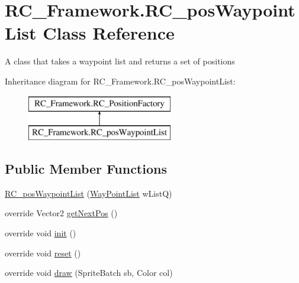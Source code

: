 \hypertarget{class_r_c___framework_1_1_r_c__pos_waypoint_list}{}\section{R\+C\+\_\+\+Framework.\+R\+C\+\_\+pos\+Waypoint\+List Class Reference}
\label{class_r_c___framework_1_1_r_c__pos_waypoint_list}


A class that takes a waypoint list and returns a set of positions  


Inheritance diagram for R\+C\+\_\+\+Framework.\+R\+C\+\_\+pos\+Waypoint\+List\+:\begin{figure}[H]
\begin{center}
\leavevmode
\includegraphics[height=2.000000cm]{class_r_c___framework_1_1_r_c__pos_waypoint_list}
\end{center}
\end{figure}
\subsection*{Public Member Functions}
\begin{DoxyCompactItemize}
\item 
\mbox{\hyperlink{class_r_c___framework_1_1_r_c__pos_waypoint_list_a25dad4f7211d21406f6d347c7ef8fda5}{R\+C\+\_\+pos\+Waypoint\+List}} (\mbox{\hyperlink{class_r_c___framework_1_1_way_point_list}{Way\+Point\+List}} w\+ListQ)
\item 
override Vector2 \mbox{\hyperlink{class_r_c___framework_1_1_r_c__pos_waypoint_list_a2f91d419c6513795cae3464fda807450}{get\+Next\+Pos}} ()
\item 
override void \mbox{\hyperlink{class_r_c___framework_1_1_r_c__pos_waypoint_list_a9bd29086f89fd9b6ad534dbf1d2785ab}{init}} ()
\item 
override void \mbox{\hyperlink{class_r_c___framework_1_1_r_c__pos_waypoint_list_acb5b5300a57cd6fc7c24db08bb27cdbf}{reset}} ()
\item 
override void \mbox{\hyperlink{class_r_c___framework_1_1_r_c__pos_waypoint_list_ae0bea3900f15e35e022f9b1d5c409067}{draw}} (Sprite\+Batch sb, Color col)
\end{DoxyCompactItemize}
